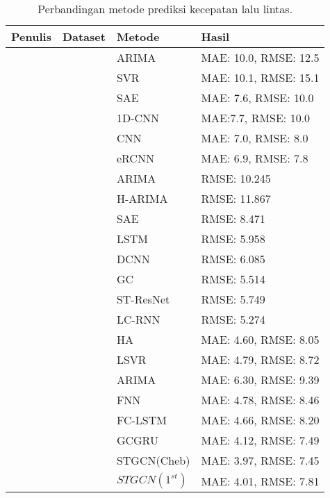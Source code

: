 \documentclass[ugmskripsi]{ugmskripsi}
\begin{document}
\begin{longtable}{|p{3.8cm}|p{3.8cm}|l|l|}
\caption{Perbandingan metode prediksi kecepatan lalu lintas.} \\ 
\hline
\textbf{Penulis} & \textbf{Dataset} & \textbf{Metode} & \textbf{Hasil} \\ 
\hline


& 
& ARIMA &  MAE: 10.0, RMSE: 12.5 \\
 &  & SVR &  MAE: 10.1, RMSE: 15.1 \\ 
 &  & SAE &  MAE: 7.6, RMSE: 10.0 \\ 
 &  & 1D-CNN &  MAE:7.7, RMSE: 10.0 \\
 &  & CNN &  MAE: 7.0, RMSE: 8.0 \\ 
 &  & eRCNN &  MAE: 6.9, RMSE: 7.8  \\ 
\hline

&  
& ARIMA &   RMSE: 10.245 \\
 &  & H-ARIMA &  RMSE: 11.867 \\ 
 &  & SAE & RMSE: 8.471 \\ 
 &  & LSTM & RMSE: 5.958 \\
 &  & DCNN & RMSE: 6.085 \\ 
 &  & GC & RMSE: 5.514 \\ 
 &  & ST-ResNet & RMSE: 5.749 \\ 
 &  & LC-RNN & RMSE: 5.274 \\ 
\hline

& 
& HA & MAE: 4.60, RMSE: 8.05 \\
 &  & LSVR & MAE: 4.79, RMSE: 8.72 \\
 &  & ARIMA &  MAE: 6.30, RMSE: 9.39 \\
 &  & FNN &  MAE: 4.78, RMSE: 8.46 \\ 
 &  & FC-LSTM & MAE: 4.66, RMSE: 8.20  \\ 
 &  & GCGRU & MAE: 4.12, RMSE: 7.49 \\
 &  & STGCN(Cheb) & MAE: 3.97, RMSE: 7.45 \\ 
 &  & $STGCN(1^{st})$ & MAE: 4.01, RMSE: 7.81 \\ 
\hline


\end{longtable}
\end{document}
